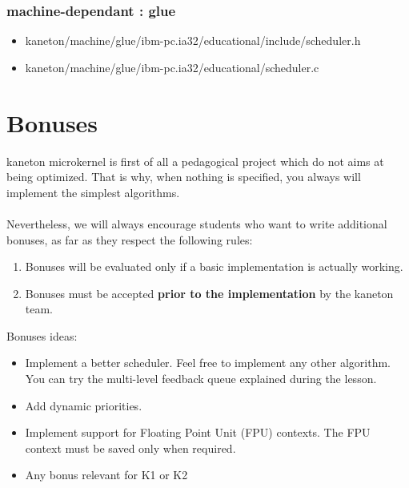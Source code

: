 \subsubsection{\color{filerefcolor} machine-dependant : glue}
\begin{itemize}
\item kaneton/machine/glue/ibm-pc.ia32/educational/include/scheduler.h
\item kaneton/machine/glue/ibm-pc.ia32/educational/scheduler.c
\end{itemize}

%
%

\newpage

\section{Bonuses}

kaneton microkernel is first of all a pedagogical project which do not
aims at being optimized. That is why, when nothing is specified, you
always will implement the simplest algorithms.\\
\\
Nevertheless, we will always encourage students who want to write
additional bonuses, as far as they respect the following rules:

\begin{enumerate}
\item Bonuses will be evaluated only if a basic implementation is
  actually working.
\item Bonuses must be accepted \textbf{prior to the implementation}
  by the kaneton team.
\end{enumerate}

Bonuses ideas:
\begin{itemize}
\item
  Implement a better scheduler. Feel free to implement any other
  algorithm. You can try the multi-level feedback queue explained
  during the lesson.

\item
  Add dynamic priorities.

\item
  Implement support for Floating Point Unit (FPU) contexts. The FPU
  context must be saved only when required.

\item
  Any bonus relevant for K1 or K2
\end{itemize}

%
%

